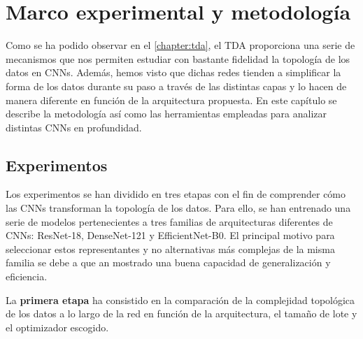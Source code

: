 
\chapter{Marco experimental y metodología}
\label{chapter:methodology}

Como se ha podido observar en el \autoref{chapter:tda}, el TDA proporciona una
serie de mecanismos que nos permiten estudiar con bastante fidelidad la
topología de los datos en CNNs. Además, hemos visto que dichas redes tienden a
simplificar la forma de los datos durante su paso a través de las distintas
capas y lo hacen de manera diferente en función de la arquitectura propuesta. En
este capítulo se describe la metodología así como las herramientas empleadas para
analizar distintas CNNs en profundidad.

\section{Experimentos}

Los experimentos se han dividido en tres etapas con el fin de comprender cómo
las CNNs transforman la topología de los datos. Para ello, se han entrenado una
serie de modelos pertenecientes a tres familias de arquitecturas diferentes de
CNNs: ResNet-18, DenseNet-121 y EfficientNet-B0. El principal motivo para seleccionar
estos representantes y no alternativas más complejas de la misma familia se debe
a que an mostrado una buena capacidad de generalización y eficiencia.

La \textbf{primera etapa} ha consistido en la comparación de la complejidad
topológica de los datos a lo largo de la red en función de la arquitectura, el tamaño
de lote y el optimizador escogido.%


